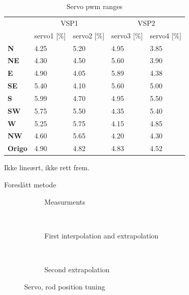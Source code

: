 \documentclass[a4paper,twoside,english]{report}
\providecommand{\tabularnewline}{\\}
\begin{document}
\begin{table}[h!]
\begin{centering}
\begin{tabular}{>{\bfseries}lllll}
\toprule 
\multirow{2}{*}{Position} & \multicolumn{2}{c}{VSP1} & \multicolumn{2}{c}{VSP2}\tabularnewline
\cmidrule{2-5} 
 & servo1 {[}\%{]} & servo2 {[}\%{]} & servo3 {[}\%{]} & servo4 {[}\%{]}\tabularnewline
\midrule
N & 4.25 & 5.20 & 4.95 & 3.85\tabularnewline
NE & 4.30 & 4.50 & 5.60 & 3.90\tabularnewline
E & 4.90 & 4.05 & 5.89 & 4.38\tabularnewline
SE & 5.40 & 4.10 & 5.60 & 5.00\tabularnewline
S & 5.99 & 4.70 & 4.95 & 5.50\tabularnewline
SW & 5.75 & 5.50 & 4.35 & 5.40\tabularnewline
W & 5.25 & 5.75 & 4.15 & 4.85\tabularnewline
NW & 4.60 & 5.65 & 4.20 & 4.30\tabularnewline
\midrule
Origo & 4.90 & 4.82 & 4.83 & 4.52\tabularnewline
\end{tabular}\caption{Servo pwm ranges}
\par\end{centering}
\centering{}\label{tab: CSE1 servo ranges} 
\end{table}

Ikke lineært, ikke rett frem.

Foreslått metode

\begin{figure}
\centering

\begin{subfigure}{.3\textwidth}
 \centering{}\caption{Measurments}\label{fig: Servo measurements}\end{subfigure}
~
\begin{subfigure}{.3\textwidth}
 \centering{}\caption{First interpolation and extrapolation}\label{fig: Servo first extrapolation}\end{subfigure}
~
\begin{subfigure}{.3\textwidth}
 \centering{}\caption{Second extrapolation}\label{fig: Servo second extrapolation}\end{subfigure}

\caption{Servo, rod position tuning}
\end{figure}
\end{document}
